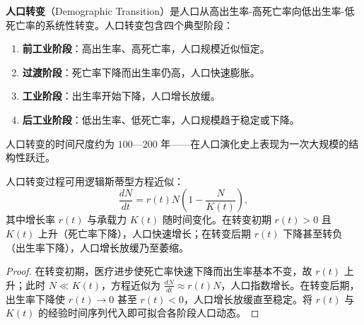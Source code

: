 \begin{definition}[人口转变]\label{def:demographic_transition}
\textbf{人口转变}（Demographic Transition）是人口从高出生率-高死亡率向低出生率-低死亡率的系统性转变。人口转变包含四个典型阶段：
\begin{enumerate}[label=(\roman*)]
    \item \textbf{前工业阶段}：高出生率、高死亡率，人口规模近似恒定。
    \item \textbf{过渡阶段}：死亡率下降而出生率仍高，人口快速膨胀。
    \item \textbf{工业阶段}：出生率开始下降，人口增长放缓。
    \item \textbf{后工业阶段}：低出生率、低死亡率，人口规模趋于稳定或下降。
\end{enumerate}
人口转变的时间尺度约为 $100$—$200$ 年——在人口演化史上表现为一次大规模的结构性跃迁。
\end{definition}

\begin{proposition}[人口转变的S型模型]\label{prop:demographic_transition_s}
人口转变过程可用逻辑斯蒂型方程近似：
\[
\frac{dN}{dt} = r(t) N \left(1 - \frac{N}{K(t)}\right),
\]
其中增长率 $r(t)$ 与承载力 $K(t)$ 随时间变化。在转变初期 $r(t) > 0$ 且 $K(t)$ 上升（死亡率下降），人口快速增长；在转变后期 $r(t)$ 下降甚至转负（出生率下降），人口增长放缓乃至萎缩。
\end{proposition}

\begin{proof}
在转变初期，医疗进步使死亡率快速下降而出生率基本不变，故 $r(t)$ 上升；此时 $N \ll K(t)$，方程近似为 $\frac{dN}{dt} \approx r(t) N$，人口指数增长。在转变后期，出生率下降使 $r(t) \to 0$ 甚至 $r(t) < 0$，人口增长放缓直至稳定。将 $r(t)$ 与 $K(t)$ 的经验时间序列代入即可拟合各阶段人口动态。
\end{proof}

